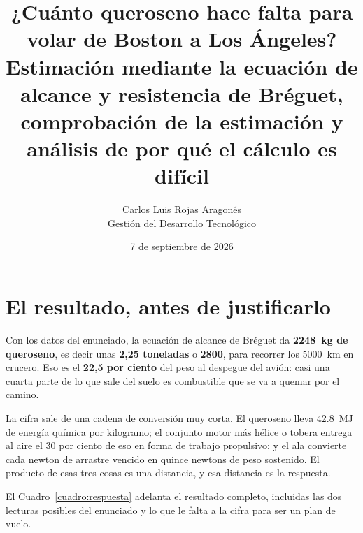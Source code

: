 \documentclass[11pt,letterpaper]{article}
\title{\vspace{-1.3cm}\textbf{¿Cuánto queroseno hace falta para volar de
Boston a Los Ángeles?}\\
\large Estimación mediante la ecuación de alcance y resistencia de Bréguet,
comprobación de la estimación y análisis de por qué el cálculo es difícil}
\author{Carlos Luis Rojas Aragonés\\
\small Gestión del Desarrollo Tecnológico}
\date{\small 7 de septiembre de 2026}
\begin{document}
\maketitle
\vspace{-0.8em}

\section{El resultado, antes de justificarlo}

Con los datos del enunciado, la ecuación de alcance de Bréguet da
\textbf{\SI{2248}{\kilogram} de queroseno}, es decir unas \textbf{2,25
toneladas} o \textbf{\SI{2800}{\litro}}, para recorrer los
\SI{5000}{\kilo\meter} en crucero. Eso es el \textbf{22,5 por ciento} del peso
al despegue del avión: casi una cuarta parte de lo que sale del suelo es
combustible que se va a quemar por el camino.

La cifra sale de una cadena de conversión muy corta. El queroseno lleva
\SI{42.8}{\mega\joule} de energía química por kilogramo; el conjunto
motor más hélice o tobera entrega al aire el 30 por ciento de eso en forma de
trabajo propulsivo; y el ala convierte cada newton de arrastre vencido en
quince newtons de peso sostenido. El producto de esas tres cosas es una
distancia, y esa distancia es la respuesta.

El Cuadro~\ref{cuadro:respuesta} adelanta el resultado completo, incluidas las
dos lecturas posibles del enunciado y lo que le falta a la cifra para ser un
plan de vuelo.
\end{document}
